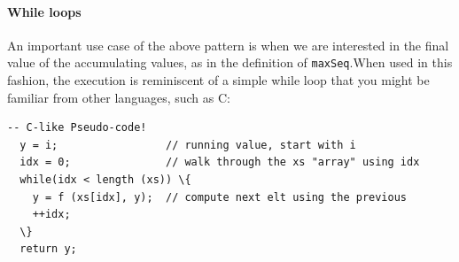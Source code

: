 \paragraph*{While loops} An important use case of the above pattern is
when we are interested in the final value of the accumulating values,
as in the definition of {\tt maxSeq}.\indRIndex\indWhileLoop When used
in this fashion, the execution is reminiscent of a simple while loop
that you might be familiar from other languages, such as C:
\begin{Verbatim}[commandchars=\\\{\}, codes={\catcode`$=3\catcode`^=7\catcode`_=8}]
  -- C-like Pseudo-code!
  y = i;                 // running value, start with i
  idx = 0;               // walk through the xs "array" using idx
  while(idx < length (xs)) \{
    y = f (xs[idx], y);  // compute next elt using the previous
    ++idx;
  \}
  return y;
\end{Verbatim}

